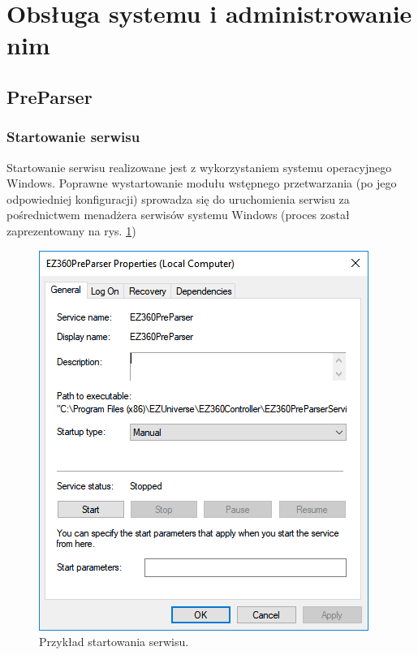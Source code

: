 \documentclass[a4paper]{book}
\begin{document}
\section{Obsługa systemu i administrowanie nim}
\subsection{PreParser}
\subsubsection{Startowanie serwisu}
Startowanie serwisu realizowane jest z wykorzystaniem systemu operacyjnego Windows. Poprawne wystartowanie modułu wstępnego przetwarzania (po jego odpowiedniej konfiguracji) sprowadza się do uruchomienia serwisu za pośrednictwem menadżera serwisów systemu Windows (proces został zaprezentowany na rys. \ref{fig:startowanie_serwisu})
\begin{figure}[t]
	\centering
	\includegraphics[width=\textwidth]{./img/startowanie_serwisu.png}
	\caption{Przykład startowania serwisu.}
	\label{fig:startowanie_serwisu}
\end{figure}
\end{document}
